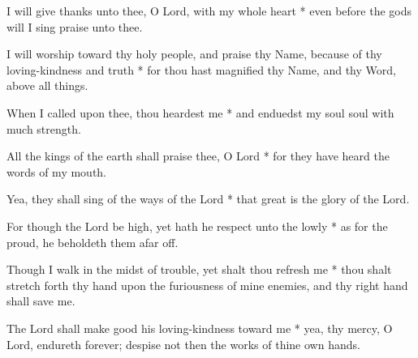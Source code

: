 \begin{multicols}{2}
	
	I will give thanks unto thee, O Lord, with my whole heart * even before the gods will I sing praise unto thee.
	
	I will worship toward thy holy people, and praise thy Name, because of thy loving-kindness and truth * for thou hast magnified thy Name, and thy Word, above all things.
	
	When I called upon thee, thou heardest me * and enduedst my soul soul with much strength.
	
	All the kings of the earth shall praise thee, O Lord * for they have heard the words of my mouth.
	
	Yea, they shall sing of the ways of the Lord * that great is the glory of the Lord.
	
	For though the Lord be high, yet hath he respect unto the lowly * as for the proud, he beholdeth them afar off.
	
	Though I walk in the midst of trouble, yet shalt thou refresh me * thou shalt stretch forth thy hand upon the furiousness of mine enemies, and thy right hand shall save me.
	
	The Lord shall make good his loving-kindness toward me * yea, thy mercy, O Lord, endureth forever; despise not then the works of thine own hands.
	
	\gloria{}
\end{multicols}